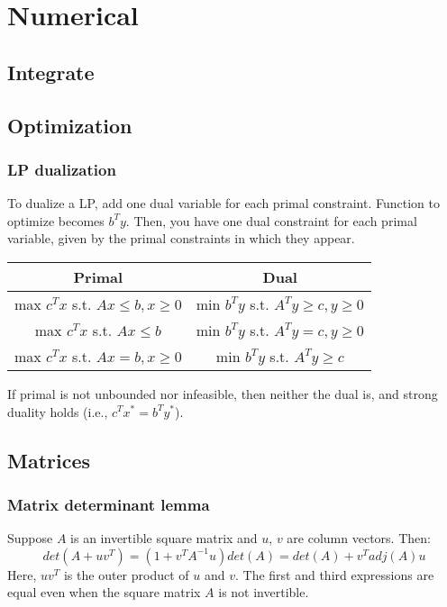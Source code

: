 \chapter{Numerical}

\section{Integrate}
  
\section{Optimization}
	
	\subsection{LP dualization}
	To dualize a LP, add one dual variable for each primal 
	constraint. Function to optimize becomes $b^T y$. 
	Then, you have one dual constraint for each primal variable, 
	given by the primal constraints in which they appear. 
	\begin{center}
		\begin{tabular}{ |c|c| } 
		 \hline
		 \textbf{Primal} & \textbf{Dual} \\
		 \hline
		 max $c^T x$ s.t. $Ax \leq b, x \geq 0$ & min $b^T y$ s.t. $A^T y \geq c, y \geq 0$ \\ 
		 max $c^T x$ s.t. $Ax \leq b$ & min $b^T y$ s.t. $A^T y = c, y \geq 0$ \\ 
		 max $c^T x$ s.t. $Ax = b, x \geq 0$ & min $b^T y$ s.t. $A^T y \geq c$ \\ 
		 \hline
		\end{tabular}
	\end{center}
	If primal is not unbounded nor infeasible, then neither the
	dual is, and strong duality holds (i.e., $c^T x^* = b^T y^*$).

\section{Matrices}

	\subsection{Matrix determinant lemma}
		Suppose $A$ is an invertible square matrix and $u$, $v$ are column vectors. Then:
		$$det(A + u v^{T}) = (1 + v^{T} A^{-1} u) det(A) = det(A) + v^{T} adj(A) u$$
		Here, $u v^{T}$ is the outer product of $u$ and $v$. 
		The first and third expressions are equal even when the square matrix $A$ is not invertible.

